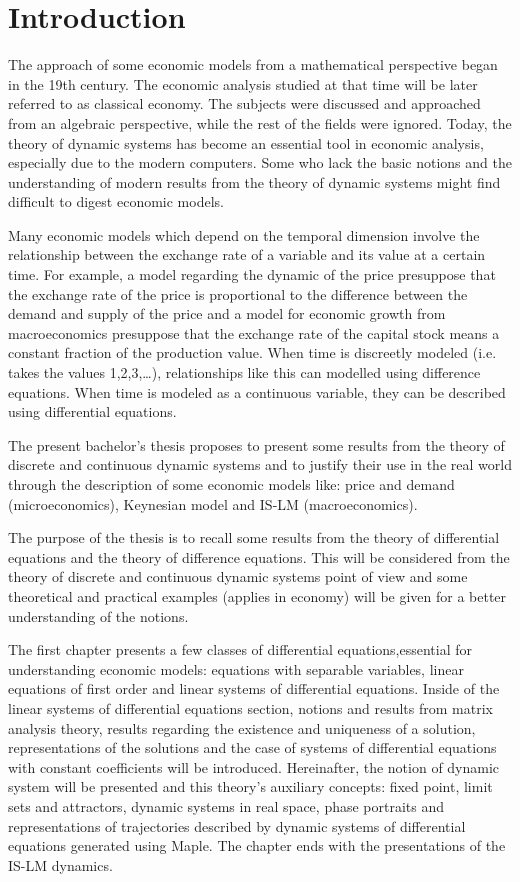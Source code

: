 \documentclass[a4paper,12pt]{report}
\newcommand\blankpage{%
    \null
    \thispagestyle{empty}%
    \addtocounter{page}{-1}%
    \newpage}
\begin{document}
 \blankpage


\chapter*{Introduction}
 The approach of some economic models from a mathematical perspective began in the 19th century. The economic analysis studied at that time will be later referred to as classical economy. The subjects were discussed and approached from an algebraic perspective, while the rest of the fields were ignored. Today, the theory of dynamic systems has become an essential tool in economic analysis, especially due to the modern computers. Some who lack the basic notions and the understanding of modern results from the theory of dynamic systems might find difficult to digest economic models. \par
 Many economic models which depend on the temporal dimension involve the relationship between the exchange rate of a variable and its value at a certain time. For example, a model regarding the dynamic of the price presuppose that the exchange rate of the price is proportional to the difference between the demand and supply of the price and a model for economic growth from macroeconomics presuppose that the exchange rate of the capital stock means a constant fraction of the production value. When time is discreetly modeled (i.e. takes the values 1,2,3,…), relationships like this can modelled using difference equations. When time is modeled as a continuous variable, they can be described using differential equations.\par
 The present bachelor’s thesis proposes to present some results from the theory of discrete and continuous dynamic systems and to justify their use in the real world through the description of some economic models like: price and demand (microeconomics), Keynesian model and IS-LM (macroeconomics).\par
 The purpose of the thesis is to recall some results from the theory of differential equations and the theory of difference equations. This will be considered from the theory of discrete and continuous dynamic systems point of view and some theoretical and practical examples (applies in economy) will be given for a better understanding of the notions.\par
The first chapter presents a few classes of differential equations,essential for understanding economic models: equations with separable variables, linear equations of first order and linear systems of differential equations. Inside of the linear systems of differential equations section, notions and results from matrix analysis theory, results regarding the existence and uniqueness of a solution, representations of the solutions and the case of systems of differential equations with constant coefficients will be introduced. Hereinafter, the notion of dynamic system will be presented and this theory’s auxiliary concepts: fixed point, limit sets and attractors, dynamic systems in real space, phase portraits and representations of trajectories described by  dynamic systems of differential equations generated using Maple. The chapter ends with the presentations of the IS-LM dynamics.\par
\end{document}
